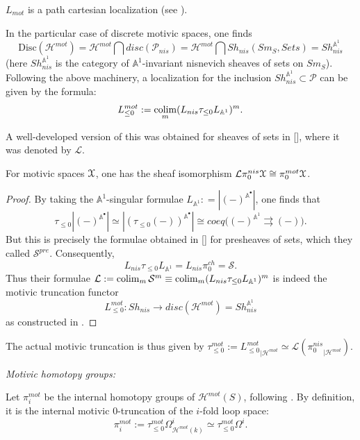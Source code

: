\begin{cor}
    $L_{mot}$ is a path cartesian localization (see ).
\end{cor}
In the particular case of discrete motivic spaces, one finds $$\mathrm{Disc}(\mathcal{H}^{mot})=\mathcal{H}^{mot}\bigcap disc(\mathcal{P}_{nis})=\mathcal{H}^{mot}\bigcap Sh_{nis}(Sm_S, Sets)=Sh_{nis}^{\mathbb{A}^1}$$ (here $Sh_{nis}^{\mathbb{A}^1}$ is the category of $\mathbb{A}^1$-invariant nisnevich sheaves of sets on $Sm_S$). Following the above machinery, a localization for the inclusion $Sh_{nis}^{\mathbb{A}^1}\subset \mathcal{P}$ can be given by the formula:
$$L_{\leq 0}^{mot}:=\operatorname*{colim}_{m} (L_{nis}\tau_{\leq 0}L_{\mathbb{A}^1})^m.$$

A well-developed version of this was obtained for sheaves of sets in [\cite{amit}], where it was denoted by $\mathcal{L}$. 
\begin{cor}
    For motivic spaces $\EuScript{X}$, one has the sheaf isomorphism $\mathcal{L}\pi_0^{nis}\EuScript{X}\cong \pi_0^{mot}\EuScript{X}$.
\end{cor}
\begin{proof}
    By taking the $\mathbb{A}^1$-singular formulae $L_{\mathbb{A}^1}: = |(-)^{\mathbb{A}^\bullet}|$, one finds that $$\tau_{\leq 0}|(-)^{\mathbb{A}^\bullet}|\simeq |(\tau_{\leq 0}(-))^{\mathbb{A}^\bullet}|\cong coeq\big ((-)^{\mathbb{A}^1}\rightrightarrows  (-)\big ).$$ But this is precisely the formulae obtained in [\cite{amit}] for presheaves of sets, which they called $\mathcal{S}^{pre}$. Consequently, $$L_{nis}\tau_{\leq 0}L_{\mathbb{A}^1}=L_{nis}\pi_0^{ch}=\mathcal{S}.$$ Thus their formulae $\mathcal{L}:=\operatorname*{colim}_{m}\mathcal{S}^m\equiv \operatorname*{colim}_{m} (L_{nis}\tau_{\leq 0}L_{\mathbb{A}^1})^m $ is indeed the motivic truncation functor $$L_{\leq 0}^{mot}: Sh_{nis}\to disc(\mathcal{H}^{mot})=Sh_{nis}^{\mathbb{A}^1}$$ as constructed in . 
\end{proof}
The actual motivic truncation is thus given by $\tau_{\leq 0}^{mot}:={L_{\leq 0}^{mot}}_{|\mathcal{H}^{mot}}\simeq \mathcal{L}({\pi_0^{nis}}_{|{\mathcal{H}^{mot}}})$.

\textit{Motivic homotopy groups: } 

Let $\pi_i^{mot}$ be the internal homotopy groups of $\mathcal{H}^{mot}(S)$, following . By definition, it is the internal motivic $0$-truncation of the $i$-fold loop space: $$\pi_i^{mot}:=\tau_{\leq 0}^{mot}\Omega_{\mathcal{H}^{mot}(k)}^i\simeq \tau_{\leq 0}^{mot}\Omega^i.$$

